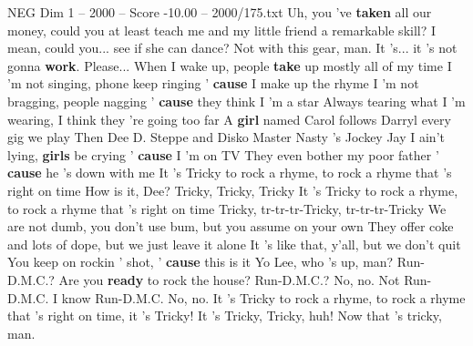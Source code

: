 \begin{textsample}{NEG Dim 1 – 2000 – Score -10.00 – 2000/175.txt}
Uh, you 've \textbf{taken} all our money, could you at least teach me and my little friend a remarkable skill?
I mean, could you... see if she can dance?
Not with this gear, man.
It 's... it 's not gonna \textbf{work}.
Please...
When I wake up, people \textbf{take} up mostly all of my time I 'm not singing, phone keep ringing ' \textbf{cause} I make up the rhyme I 'm not bragging, people nagging ' \textbf{cause} they think I 'm a star Always tearing what I 'm wearing, I think they 're going too far A \textbf{girl} named Carol follows Darryl every gig we play Then Dee D.
Steppe and Disko Master Nasty 's Jockey Jay I ain't lying, \textbf{girls} be crying ' \textbf{cause} I 'm on TV They even bother my poor father ' \textbf{cause} he 's down with me It 's Tricky to rock a rhyme, to rock a rhyme that 's right on time How is it, Dee?
Tricky, Tricky, Tricky It 's Tricky to rock a rhyme, to rock a rhyme that 's right on time Tricky, tr-tr-tr-Tricky, tr-tr-tr-Tricky We are not dumb, you don't use bum, but you assume on your own They offer coke and lots of dope, but we just leave it alone It 's like that, y'all, but we don't quit You keep on rockin ' shot, ' \textbf{cause} this is it Yo Lee, who 's up, man?
Run-D.M.C.?
Are you \textbf{ready} to rock the house?
Run-D.M.C.?
No, no.
Not Run-D.M.C.
I know Run-D.M.C.
No, no.
It 's Tricky to rock a rhyme, to rock a rhyme that 's right on time, it 's Tricky!
It 's Tricky, Tricky, huh!
Now that 's tricky, man.

\end{textsample}
